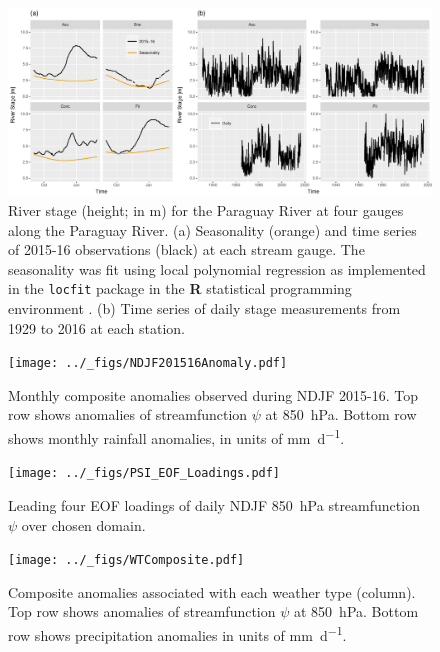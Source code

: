 \documentclass{ametsoc}
\begin{document}
\begin{figure}
	\noindent\includegraphics[width=6.5in]{./Streamflow.pdf}
	\caption{
		River stage (height; in \si{\meter}) for the Paraguay River at four gauges along the Paraguay River.
		(a) Seasonality (orange) and time series of 2015-16 observations (black) at each stream gauge.
			The seasonality was fit using local polynomial regression as implemented in the \texttt{locfit} package in
			the \textbf{R} statistical programming environment \citep{Loader1999}.
		(b) Time series of daily stage measurements from 1929 to 2016 at each station.
	}
  \label{fig:streamflow}
\end{figure}

\begin{figure}
	\noindent\texttt{[image: ../\_figs/NDJF201516Anomaly.pdf]}
	\caption{
    	Monthly composite anomalies observed during NDJF 2015-16.
      Top row shows anomalies of streamfunction $\psi$ at \SI{850}{\hecto\pascal}.
      Bottom row shows monthly rainfall anomalies, in units of \si{\milli\meter\per\day}.
	}
  \label{fig:anomalies}
\end{figure}

\begin{figure}
	\noindent\texttt{[image: ../\_figs/PSI\_EOF\_Loadings.pdf]}
	\caption{
    	Leading four EOF loadings of daily NDJF \SI{850}{\hecto\pascal} streamfunction $\psi$ over chosen domain.
	}
  \label{fig:eof-loading}
\end{figure}

\begin{figure}
	\noindent\texttt{[image: ../\_figs/WTComposite.pdf]}
	\caption{
		Composite anomalies associated with each weather type (column).
    Top row shows anomalies of streamfunction $\psi$ at \SI{850}{\hecto\pascal}.
    Bottom row shows precipitation anomalies in units of \si{\milli\meter\per\day}.
	}
	\label{fig:wt-composite}
\end{figure}
\end{document}
